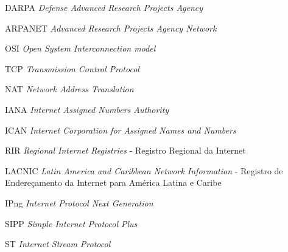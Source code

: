 \begin{siglas}

	\item[DARPA]    \textit{Defense Advanced Research Projects Agency}
	\item[ARPANET]  \textit{Advanced Research Projects Agency Network}
	\item[OSI]      \textit{Open System Interconnection model}
	\item[TCP]      \textit{Transmission Control Protocol}
	\item[NAT]      \textit{Network Address Translation}
	\item[IANA]     \textit{Internet Assigned Numbers Authority}
	\item[ICAN]     \textit{Internet Corporation for Assigned Names and Numbers}
	\item[RIR]      \textit{Regional Internet Registries} - Registro Regional da Internet
	\item[LACNIC]   \textit{Latin America and Caribbean Network Information} - Registro de Endereçamento da Internet para América Latina e Caribe
	\item[IPng]     \textit{Internet Protocol Next Generation}
	\item[SIPP]     \textit{Simple Internet Protocol Plus}
	\item[ST]       \textit{Internet Stream Protocol}
	\item[]      \textit{}

\end{siglas}
